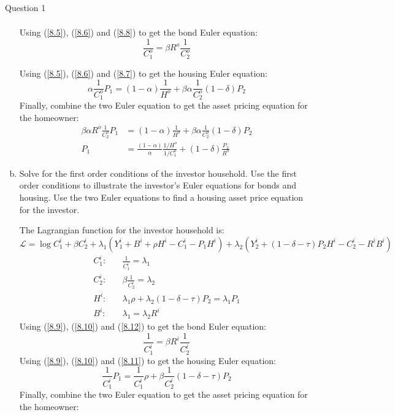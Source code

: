 \documentclass[a4paper]{article}
\begin{document}
\begin{questionbox}{Question 1}
\begin{enumerate}[(a)]
\begin{explanationbox}
\begin{align}
				\end{align}
				Using (\ref{8.5}), (\ref{8.6}) and (\ref{8.8}) to get the bond Euler equation:
				\[
					\frac{1}{C_1^o} = \beta R^o	\frac{1}{C_2^o}
				\]
			\end{explanationbox}
			\begin{explanationbox}
				Using (\ref{8.5}), (\ref{8.6}) and (\ref{8.7}) to get the housing Euler equation:
				\[
					\alpha\frac{1}{C_1^o} P_1 = (1-\alpha)\frac{1}{H^o}+\beta\alpha\frac{1}{C_2^o}(1-\delta)P_2
				\]
				Finally, combine the two Euler equation to get the asset pricing equation for the homeowner:
				\begin{align*}
					\beta\alpha R^o	\frac{1}{C_2^o} P_1 &= (1-\alpha)\frac{1}{H^o}+\beta\alpha\frac{1}{C_2^o}(1-\delta)P_2\\
					P_1 &= \frac{(1-\alpha)}{\alpha}\frac{1/H^o}{1/C_1^o}+(1-\delta)\frac{P_2}{R^o}
				\end{align*}
			\end{explanationbox}
			\item Solve for the first order conditions of the investor household. Use the first order conditions to illustrate the investor's Euler equations for bonds and housing. Use the two Euler equations to find a housing asset price equation for the investor.
			\begin{explanationbox}
			The Lagrangian function for the investor household is:
			\[
				\mathcal{L} = \log C_1^i + \beta C_2^i + \lambda_1(Y_1^i + B^i + \rho H^i - C_1^i - P_1 H^i) + \lambda_2( Y_2^i + (1-\delta-\tau)P_2H^i - C_2^i - R^iB^i)
			\]
			\begin{align}
				C_1^i:\quad &\frac{1}{C_1^i} = \lambda_1 \label{8.9}\\ 
				C_2^i:\quad &\beta\frac{1}{C_2^i} = \lambda_2 \label{8.10}\\ 
				H^i:\quad &\lambda_1\rho + \lambda_2(1-\delta-\tau)P_2 = \lambda_1P_1 \label{8.11}\\ 
				B^i:\quad &\lambda_1 = \lambda_2 R^i \label{8.12}
			\end{align}
			Using (\ref{8.9}), (\ref{8.10}) and (\ref{8.12}) to get the bond Euler equation:
			\[
				\frac{1}{C_1^i} = \beta R^i	\frac{1}{C_2^i}
			\]
			Using (\ref{8.9}), (\ref{8.10}) and (\ref{8.11}) to get the housing Euler equation:
			\[
				\frac{1}{C_1^i} P_1 = \frac{1}{C_1^i}\rho + \beta\frac{1}{C_2^i}(1-\delta-\tau)P_2
			\]
			Finally, combine the two Euler equation to get the asset pricing equation for the homeowner:
			\begin{align*}

\end{align*}
\end{explanationbox}
\end{enumerate}
\end{questionbox}
\end{document}
